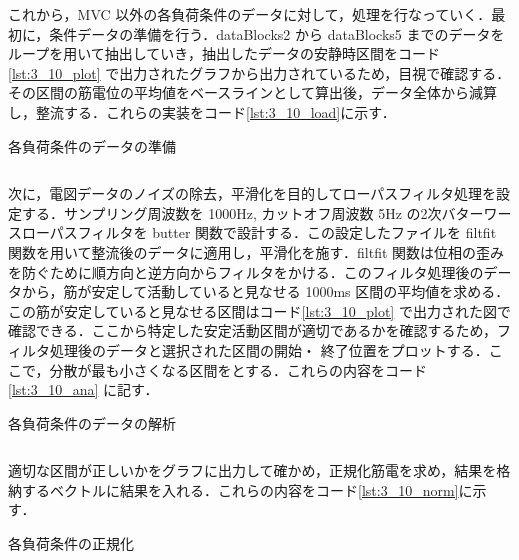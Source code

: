 \documentclass[dvipdfmx, titlepage, t]{jsarticle}
\begin{document}
    これから，MVC 以外の各負荷条件のデータに対して，処理を行なっていく．最初に，条件データの準備を行う．dataBlocks{2} から dataBlocks{5} までのデータをループを用いて抽出していき，抽出したデータの安静時区間をコード\ref{lst:3_10_plot} で出力されたグラフから出力されているため，目視で確認する．その区間の筋電位の平均値をベースラインとして算出後，データ全体から減算し，整流する．これらの実装をコード\ref{lst:3_10_load}に示す．

    \begin{program}[H]
        \caption{各負荷条件のデータの準備}
        \inputminted[linenos,
        firstline=53,
        lastline=73,
        frame=lines,
        fontsize = \small]{matlab}{code/Exp3_10_Matlab.m}
        \label{lst:3_10_load}
    \end{program}

    次に，電図データのノイズの除去，平滑化を目的してローパスフィルタ処理を設定する．サンプリング周波数を 1000Hz, カットオフ周波数 5Hz の2次バターワースローパスフィルタを butter 関数で設計する．この設定したファイルを filtfit 関数を用いて整流後のデータに適用し，平滑化を施す．filtfit 関数は位相の歪みを防ぐために順方向と逆方向からフィルタをかける．このフィルタ処理後のデータから，筋が安定して活動していると見なせる 1000ms 区間の平均値を求める．この筋が安定していると見なせる区間はコード\ref{lst:3_10_plot} で出力された図で確認できる．ここから特定した安定活動区間が適切であるかを確認するため，フィルタ処理後のデータと選択された区間の開始・
    終了位置をプロットする．ここで，分散が最も小さくなる区間をとする．これらの内容をコード\ref{lst:3_10_ana} に記す．

    \begin{program}[H]
        \caption{各負荷条件のデータの解析}
        \inputminted[linenos,
        firstline=76,
        lastline=113,
        frame=lines,
        fontsize = \small]{matlab}{code/Exp3_10_Matlab.m}
        \label{lst:3_10_ana}        
    \end{program}

    適切な区間が正しいかをグラフに出力して確かめ，正規化筋電を求め，結果を格納するベクトルに結果を入れる．これらの内容をコード\ref{lst:3_10_norm}に示す．

    \begin{program}[H]
        \caption{各負荷条件の正規化}
        \inputminted[linenos,
        firstline=118,
        lastline=140,
        frame=lines,
        fontsize = \small]{matlab}{code/Exp3_10_Matlab.m}
        \label{lst:3_10_norm}
    \end{program}
\end{document}
